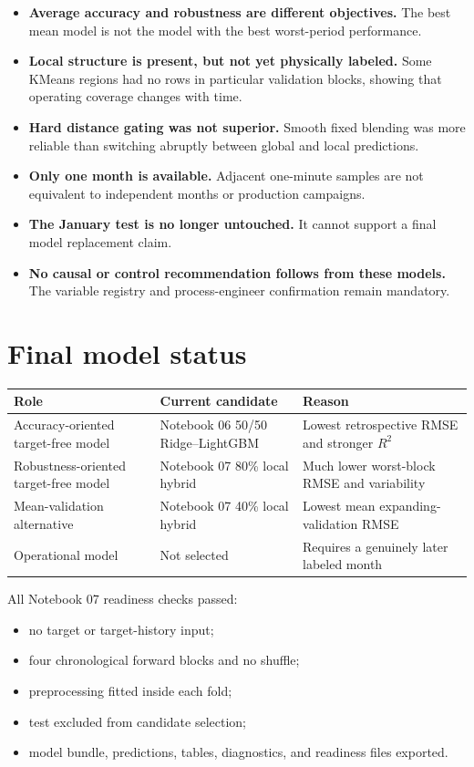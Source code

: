 \documentclass[10pt,a4paper]{article}
\begin{document}
\begin{itemize}
  \item \textbf{Average accuracy and robustness are different objectives.} The best mean model is not the model with the best worst-period performance.
  \item \textbf{Local structure is present, but not yet physically labeled.} Some KMeans regions had no rows in particular validation blocks, showing that operating coverage changes with time.
  \item \textbf{Hard distance gating was not superior.} Smooth fixed blending was more reliable than switching abruptly between global and local predictions.
  \item \textbf{Only one month is available.} Adjacent one-minute samples are not equivalent to independent months or production campaigns.
  \item \textbf{The January test is no longer untouched.} It cannot support a final model replacement claim.
  \item \textbf{No causal or control recommendation follows from these models.} The variable registry and process-engineer confirmation remain mandatory.
\end{itemize}

\section{Final model status}

\begin{tabularx}{\textwidth}{L{0.25\textwidth}Y Y}
\toprule
\textbf{Role} & \textbf{Current candidate} & \textbf{Reason} \\
\midrule
Accuracy-oriented target-free model & Notebook 06 50/50 Ridge--LightGBM & Lowest retrospective RMSE and stronger $R^2$ \\
Robustness-oriented target-free model & Notebook 07 80\% local hybrid & Much lower worst-block RMSE and variability \\
Mean-validation alternative & Notebook 07 40\% local hybrid & Lowest mean expanding-validation RMSE \\
Operational model & Not selected & Requires a genuinely later labeled month \\
\bottomrule
\end{tabularx}

All Notebook 07 readiness checks passed:
\begin{itemize}
  \item no target or target-history input;
  \item four chronological forward blocks and no shuffle;
  \item preprocessing fitted inside each fold;
  \item test excluded from candidate selection;
  \item model bundle, predictions, tables, diagnostics, and readiness files exported.
\end{itemize}
\end{document}
